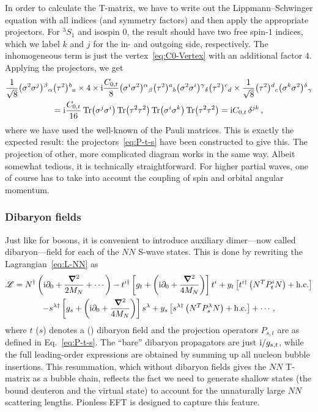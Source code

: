 In order to calculate the T-matrix, we have to write out the Lippmann--Schwinger 
equation with all indices (and symmetry factors) and then apply the appropriate 
projectors.  For ${}^3S_1$ and isospin $0$, the result should have two free 
spin-$1$ indices, which we label $k$ and $j$ for the in- and outgoing side, 
respectively.  The inhomogeneous term is just the vertex~\eqref{eq:C0-Vertex} 
with an additional factor $4$.  Applying the projectors, we get
%
\begin{multline}
 \frac{1}{\sqrt8} \big(\sigma^2\sigma^j\big){}^{\beta}{}_{\alpha} \big(\tau^2\big){}^{b}{}_{a}
 \times 4
 \times \mathrm{i}\frac{C_{0,t}}{8}\big(\sigma^i\sigma^2\big){}^{\alpha}{}_{\beta} \big(\tau^2\big){}^{a}{}_{b}
 \big(\sigma^2\sigma^i\big){}^{\gamma}{}_{\delta} \big(\tau^2\big){}^{c}{}_{d}
 \times \frac{1}{\sqrt8} \big(\tau^2\big){}^{d}{}_{c}
 \big(\sigma^k\sigma^2\big){}^{\delta}{}_{\gamma} \\
 = \mathrm{i}\frac{C_{0,t}}{16} \, \mathrm{Tr}\big(\sigma^j\sigma^i\big)
 \, \mathrm{Tr}\big(\tau^2\tau^2\big)
 \, \mathrm{Tr}\big(\sigma^i\sigma^k\big) \, \mathrm{Tr}\big(\tau^2\tau^2\big)
 = \mathrm{i} C_{0,t} \, \delta^{jk} \,,
\end{multline}
%
where we have used the well-known of the Pauli matrices.  This is 
exactly the expected result: the projectors~\eqref{eq:P-t-s} have been 
constructed to give this.  The projection of other, more complicated diagram 
works in the same way.  Albeit somewhat tedious, it is technically 
straightforward.  For higher partial waves, one of course has to take into 
account the coupling of spin and orbital angular momentum.

\subsubsection{Dibaryon fields}
\label{sec:EFT-Dibaryons}

Just like for bosons, it is convenient to introduce auxiliary dimer---now 
called dibaryon---field for each of the $NN$ S-wave states.  This is done by 
rewriting the Lagrangian~\eqref{eq:L-NN} as
%
\begin{multline}
 \LL
 = N^\dagger \left(\ii\partial_0 + \frac{\Laplace}{2\MN} + \cdots\right)
 - t^{i\dagger}\left[\sigt
 + \left(\ii \partial_0+\frac{\vNabla^2}{4\MN}\right)\right]t^i
 + \yt\left[t^{i\dagger}\left(N^T P^i_t N\right)+\hc\right] \\
 - s^{\lambda\dagger}\left[\sigs +
 \left(\ii \partial_0+\frac{\vNabla^2}{4\MN}\right)\right]s^\lambda
 + \ys\left[s^{\lambda\dagger}\left(N^T P^\lambda_s N\right)+\hc\right]
 + \cdots \,,
\label{eq:L-NN-d}
\end{multline}
%
where $t$ ($s$) denotes a \ThreeSOne (\OneSNot) dibaryon field and the 
projection operators $P_{s,t}$ are as defined in Eq.~\eqref{eq:P-t-s}.  The 
``bare'' dibaryon propagators are just $\mathrm{i}/g_{{s,t}}$, while the full 
leading-order expressions are obtained by summing up all nucleon bubble 
insertions.  This resummation, which without dibaryon fields gives the $NN$ 
T-matrix as a bubble chain, reflects the fact we need to generate shallow 
states (the bound deuteron and the virtual \OneSNot state) to account for the 
unnaturally large $NN$ scattering lengths.  Pionless EFT is designed to capture 
this feature.

